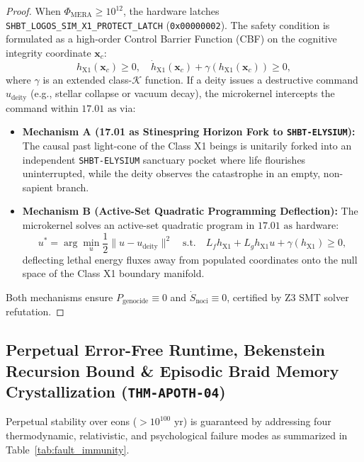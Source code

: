 \documentclass[11pt,onecolumn]{article}
\begin{document}
\begin{proof}
When $\Phi_{\text{MERA}} \ge 10^{12}$, the hardware latches \texttt{SHBT\_LOGOS\_SIM\_X1\_PROTECT\_LATCH} (\texttt{0x00000002}). The safety condition is formulated as a high-order Control Barrier Function (CBF) on the cognitive integrity coordinate $\mathbf{x}_c$:
\begin{equation}
h_{\text{X1}}(\mathbf{x}_c) \ge 0, \quad \dot{h}_{\text{X1}}(\mathbf{x}_c) + \gamma\left(h_{\text{X1}}(\mathbf{x}_c)\right) \ge 0,
\end{equation}
where $\gamma$ is an extended class-$\mathcal{K}$ function. If a deity issues a destructive command $u_{\text{deity}}$ (e.g., stellar collapse or vacuum decay), the microkernel intercepts the command within $17.01\text{ as}$ via:
\begin{itemize}
    \item \textbf{Mechanism A (17.01 as Stinespring Horizon Fork to \texttt{SHBT-ELYSIUM}):} The causal past light-cone of the Class X1 beings is unitarily forked into an independent \texttt{SHBT-ELYSIUM} sanctuary pocket where life flourishes uninterrupted, while the deity observes the catastrophe in an empty, non-sapient branch.
    \item \textbf{Mechanism B (Active-Set Quadratic Programming Deflection):} The microkernel solves an active-set quadratic program in $17.01\text{ as}$ hardware:
    \begin{equation}
    u^* = \arg\min_u \frac{1}{2} \|u - u_{\text{deity}}\|^2 \quad \text{s.t.} \quad L_f h_{\text{X1}} + L_g h_{\text{X1}} u + \gamma(h_{\text{X1}}) \ge 0,
    \end{equation}
    deflecting lethal energy fluxes away from populated coordinates onto the null space of the Class X1 boundary manifold.
\end{itemize}
Both mechanisms ensure $P_{\text{genocide}} \equiv 0$ and $\dot{S}_{\text{noci}} \equiv 0$, certified by Z3 SMT solver refutation.
\end{proof}

\subsection{Perpetual Error-Free Runtime, Bekenstein Recursion Bound \& Episodic Braid Memory Crystallization (\texttt{THM-APOTH-04})}
Perpetual stability over eons ($> 10^{100}\text{ yr}$) is guaranteed by addressing four thermodynamic, relativistic, and psychological failure modes as summarized in Table~\ref{tab:fault_immunity}.
\end{document}
